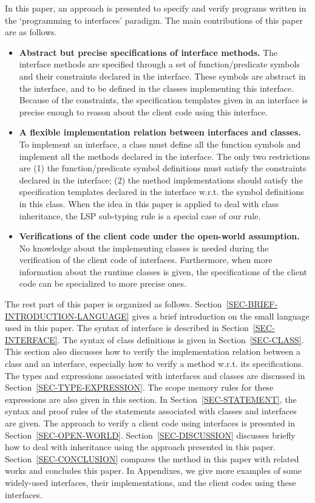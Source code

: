 \documentclass[fleqn]{llncs}
\begin{document}
In this paper, an approach is presented to specify and verify programs written in the `programming to interfaces' paradigm. The main contributions of this paper are as follows.
\begin{itemize}
\item \textbf{Abstract but precise specifications of interface methods.} The interface methods are specified through a set of function/predicate symbols and their constraints declared in the interface. These symbols are abstract in the interface, and to be defined in the classes implementing this interface. Because of the constraints, the specification templates given in an interface is precise enough to reason about the client code using this interface.
\item \textbf{A flexible implementation relation between interfaces and classes.} To implement an interface, a class must define all the function symbols and implement all  the methods declared in the interface.  The only two restrictions are (1) the function/predicate symbol definitions must satisfy the constraints declared in the interface; (2) the method implementations should satisfy the specification templates declared in the interface w.r.t. the symbol definitions in this class.
    When the idea in this paper is applied to deal with class inheritance, the LSP sub-typing rule is a special case of our rule.
\item \textbf{Verifications of the client code under the open-world assumption.} No knowledge about the implementing classes is needed during the verification of the client
    code of interfaces. Furthermore, when more information about the runtime classes is given, the specifications of the client code can be specialized to more precise ones.
\end{itemize}


The rest part of this paper is organized as follows. Section~\ref{SEC-BRIEF-INTRODUCTION-LANGUAGE} gives a brief introduction on the small language used in this paper. The syntax of interface is described in Section~\ref{SEC-INTERFACE}. The syntax of class definitions is given in  Section~\ref{SEC-CLASS}. This section also
discusses how to verify the implementation relation between a class and an interface, especially how to verify
a method w.r.t. its specifications. The types and expressions associated with interfaces and classes are discussed in Section~\ref{SEC-TYPE-EXPRESSION}. The scope memory rules for these expressions are also given in this section.
In Section~\ref{SEC-STATEMENT}, the syntax and proof rules of the statements associated with classes and interfaces are given. The approach to verify
a client code using interfaces is presented in Section~\ref{SEC-OPEN-WORLD}. Section~\ref{SEC-DISCUSSION} discusses briefly how to deal with inheritance using the approach
presented in this paper. Section~\ref{SEC-CONCLUSION} compares the method in this paper with related works and concludes this paper.
In Appendixes, we give more examples of some widely-used interfaces, their implementations,
and the client codes using these interfaces.
\end{document}
